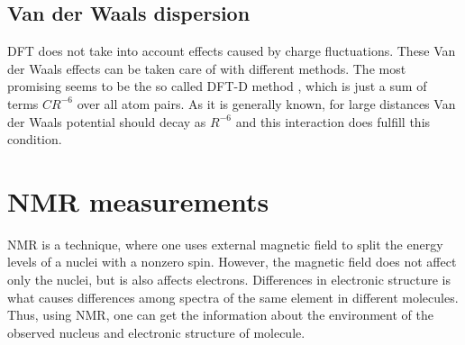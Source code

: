 \documentclass[openany, longbibliography,slovene,a4paper,12pt]{article}
\begin{document}
\subsection{Van der Waals dispersion}
DFT does not take into account effects caused by charge fluctuations. These Van
der Waals effects can be taken care of with different methods.
 The most promising seems to be the so called DFT-D method
\cite{consis_accur_ab_initio_param}, which is just a sum of terms $CR^{-6}$
over all atom pairs. As it is generally known, for large distances Van der Waals
potential should decay as $R^{-6}$ and this interaction does fulfill this
condition.


\section{NMR measurements}
NMR is a technique, where one uses external magnetic field to split the energy levels of
a nuclei with a nonzero spin. However, the magnetic field does not affect only
the nuclei, but is also affects electrons. Differences in electronic structure is
what causes differences among spectra of the same element in different molecules.
Thus, using NMR, one can get the information about the environment of the
observed nucleus and electronic structure of molecule.
\end{document}
